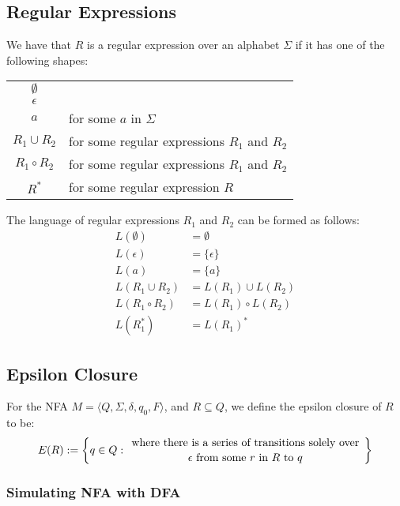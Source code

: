 \subsection{Regular Expressions}

We have that $R$ is a regular expression over an alphabet
$\Sigma$ if it has one of the following shapes:
\begin{center}
    \begin{tabular}{ c l }
        $\emptyset$ & \\
        $\epsilon$ & \\
        $a$ & for some $a$ in $\Sigma$ \\
        $R_1 \cup R_2$ & for some regular expressions $R_1$ and $R_2$ \\
        $R_1 \circ R_2$ & for some regular expressions $R_1$ and $R_2$ \\
        $R^*$ & for some regular expression $R$ \\
    \end{tabular}
\end{center} The language of regular expressions $R_1$ and $R_2$
can be formed as follows: \begin{align*}
    L(\emptyset) &= \emptyset \\
    L(\epsilon) &= \{\epsilon\} \\
    L(a) &= \{a\} \\
    L(R_1 \cup R_2) &= L(R_1) \cup L(R_2) \\
    L(R_1 \circ R_2) &= L(R_1) \circ L(R_2) \\
    L(R_1^*) &= L(R_1)^*
\end{align*}

\subsection{Epsilon Closure}

For the NFA $M =  \langle Q, \Sigma, \delta, q_0, F \rangle$, 
and $R \subseteq Q$, we define the epsilon closure
of $R$ to be: \begin{gather*}
    E(R) := \left\{
        q \in Q : \bfrac{
        \text{ where there is a series of 
        transitions solely over }
    }{
        \epsilon \text{ from some } r \text{ in } 
        R \text{ to } q
    }\right\}
\end{gather*}

\subsubsection{Simulating NFA with DFA}

